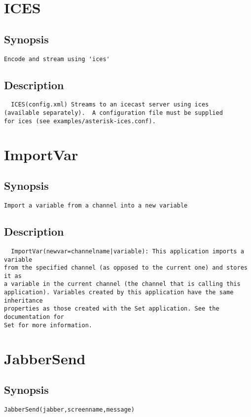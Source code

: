 \section{ICES}
\subsection{Synopsis}
\begin{verbatim}
Encode and stream using 'ices'
\end{verbatim}
\subsection{Description}
\begin{verbatim}
  ICES(config.xml) Streams to an icecast server using ices
(available separately).  A configuration file must be supplied
for ices (see examples/asterisk-ices.conf). 

\end{verbatim}


\section{ImportVar}
\subsection{Synopsis}
\begin{verbatim}
Import a variable from a channel into a new variable
\end{verbatim}
\subsection{Description}
\begin{verbatim}
  ImportVar(newvar=channelname|variable): This application imports a variable
from the specified channel (as opposed to the current one) and stores it as
a variable in the current channel (the channel that is calling this
application). Variables created by this application have the same inheritance
properties as those created with the Set application. See the documentation for
Set for more information.

\end{verbatim}


\section{JabberSend}
\subsection{Synopsis}
\begin{verbatim}
JabberSend(jabber,screenname,message)
\end{verbatim}
